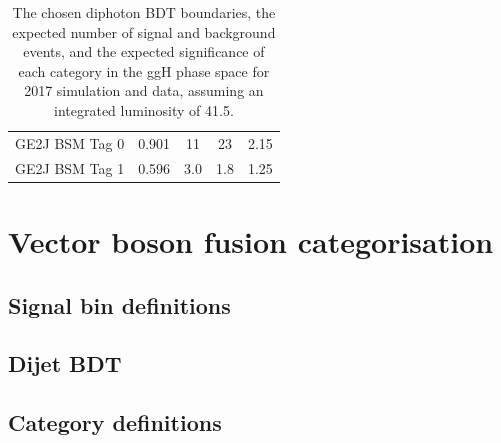 \begin{table}
\begin{centering}
\begin{tabular}{ r | c | c | c | c }
    GE2J BSM  Tag 0  & 0.901            & 11     & 23         & 2.15                    \\
    GE2J BSM  Tag 1  & 0.596            & 3.0    & 1.8        & 1.25                    \\
    \hline 
    \end{tabular}
    \caption{The chosen diphoton BDT boundaries, 
    the expected number of signal and background events, 
    and the expected significance of each category in the ggH phase space 
    for 2017 simulation and data, assuming an integrated luminosity of \SI{41.5}{\fbinv}.}
    \label{tab:cat_ggHsignificance2017}
  \end{centering}
\end{table}

\section{Vector boson fusion categorisation}
\subsection{Signal bin definitions}
\subsection{Dijet BDT}
\subsection{Category definitions}
